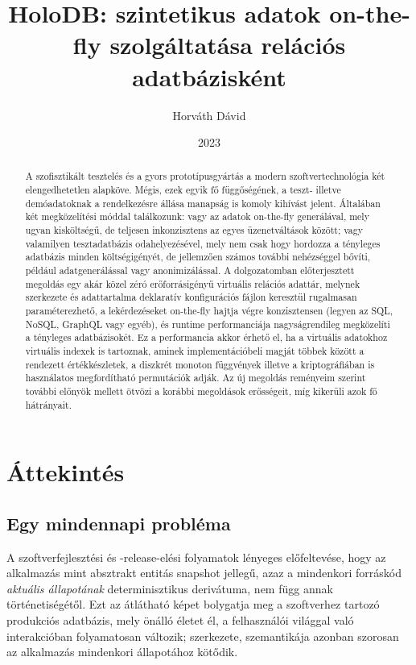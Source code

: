 \documentclass[
    parspace,
    noindent,
    nohyp,
]{elteiktdk}[2023/04/10]
\title{HoloDB: szintetikus adatok on-the-fly szolgáltatása relációs adatbázisként}
\date{2023}
\author{Horváth Dávid}
\affiliation{PhD, Mesteroktató}
\begin{document}

\listoftodos
\cleardoublepage

\makecover
\cleardoublepage

\maketitle

\tableofcontents
\cleardoublepage


\begin{abstract}
A szofisztikált tesztelés és a gyors prototípusgyártás
a modern szoftvertechnológia két elengedhetetlen alapköve.
Mégis, ezek egyik fő függőségének, a teszt- illetve demóadatoknak
a rendelkezésre állása manapság is komoly kihívást jelent.
Általában két megközelítési móddal találkozunk:
vagy az adatok on-the-fly generálával, mely ugyan kisköltségű,
de teljesen inkonzisztens az egyes üzenetváltások között;
vagy valamilyen tesztadatbázis odahelyezésével,
mely nem csak hogy hordozza a tényleges adatbázis minden költségigényét,
de jellemzően számos további nehézséggel bővíti, például adatgenerálással vagy anonimizálással.
A dolgozatomban előterjesztett megoldás egy akár közel zéró erőforrásigényű virtuális relációs adattár,
melynek szerkezete és adattartalma deklaratív
konfigurációs fájlon keresztül rugalmasan paraméterezhető,
a lekérdezéseket on-the-fly hajtja végre konzisztensen
(legyen az SQL, NoSQL, GraphQL vagy egyéb),
és runtime performanciája nagyságrendileg megközelíti a tényleges adatbázisokét.
Ez a performancia akkor érhető el, ha a virtuális adatokhoz virtuális indexek is tartoznak,
aminek implementációbeli magját többek között a rendezett értékkészletek,
a diszkrét monoton függvények
illetve a kriptográfiában is használatos megfordítható permutációk adják.
Az új megoldás reményeim szerint további előnyök mellett ötvözi a korábbi megoldások erősségeit,
míg kikerüli azok fő hátrányait.
\end{abstract}

\chapter{Áttekintés}

\section{Egy mindennapi probléma}

A szoftverfejlesztési és -release-elési folyamatok lényeges előfeltevése,
hogy az alkalmazás mint absztrakt entitás snapshot jellegű,
azaz a mindenkori forráskód \textit{aktuális állapotának} determinisztikus derivátuma,
nem függ annak történetiségétől.
Ezt az átlátható képet bolygatja meg a szoftverhez tartozó produkciós adatbázis,
mely önálló életet él, a felhasználói világgal való interakcióban folyamatosan változik;
szerkezete, szemantikája azonban szorosan az alkalmazás mindenkori állapotához kötődik.
\end{document}
